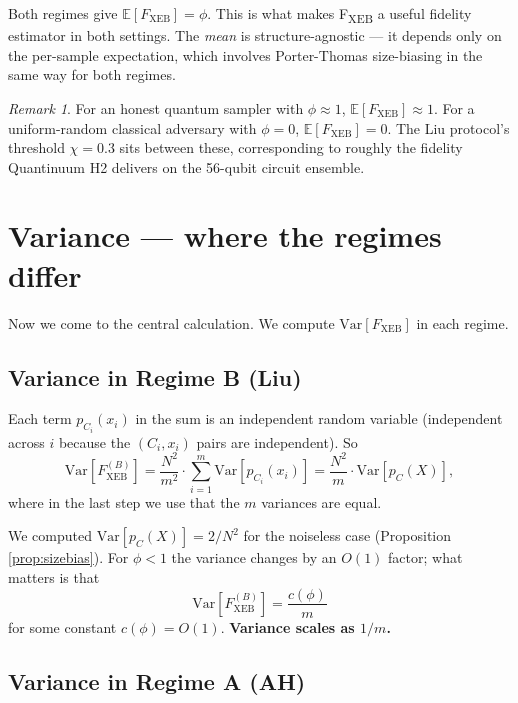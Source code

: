 \documentclass[11pt]{article}
\theoremstyle{definition}
\theoremstyle{remark}
\newtheorem*{remark}{Remark}
\newcommand{\E}{\mathbb{E}}
\newcommand{\Var}{\mathrm{Var}}
\begin{document}
\begin{intuition}
Both regimes give $\E[F_{\mathrm{XEB}}] = \phi$. This is what makes
F\textsubscript{XEB} a useful fidelity estimator in both settings. The
\emph{mean} is structure-agnostic --- it depends only on the per-sample
expectation, which involves Porter-Thomas size-biasing in the same way for
both regimes.
\end{intuition}

\begin{remark}
For an honest quantum sampler with $\phi \approx 1$, $\E[F_{\mathrm{XEB}}]
\approx 1$. For a uniform-random classical adversary with $\phi = 0$,
$\E[F_{\mathrm{XEB}}] = 0$. The Liu protocol's threshold $\chi = 0.3$ sits
between these, corresponding to roughly the fidelity Quantinuum H2 delivers
on the 56-qubit circuit ensemble.
\end{remark}

\section{Variance --- where the regimes differ}
\label{sec:variance}

Now we come to the central calculation. We compute $\Var[F_{\mathrm{XEB}}]$
in each regime.

\subsection{Variance in Regime B (Liu)}

Each term $p_{C_i}(x_i)$ in the sum is an independent random variable
(independent across $i$ because the $(C_i, x_i)$ pairs are independent).
So
\begin{equation}
  \Var[F_{\mathrm{XEB}}^{(B)}] = \frac{N^2}{m^2} \cdot \sum_{i=1}^m
  \Var[p_{C_i}(x_i)] = \frac{N^2}{m} \cdot \Var[p_C(X)],
  \label{eq:varB}
\end{equation}
where in the last step we use that the $m$ variances are equal.

We computed $\Var[p_C(X)] = 2/N^2$ for the noiseless case (Proposition
\ref{prop:sizebias}). For $\phi < 1$ the variance changes by an $O(1)$
factor; what matters is that
\begin{equation}
  \Var[F_{\mathrm{XEB}}^{(B)}] = \frac{c(\phi)}{m}
  \label{eq:varB-rate}
\end{equation}
for some constant $c(\phi) = O(1)$. \textbf{Variance scales as $1/m$.}

\subsection{Variance in Regime A (AH)}
\end{document}
